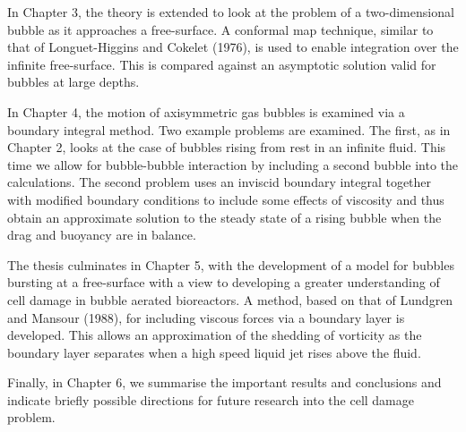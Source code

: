 In Chapter 3, the theory is extended to look at the problem of 
a two-dimensional bubble as it 
approaches a free-surface. A conformal map technique, similar to that of
Longuet-Higgins and Cokelet (1976), is used to enable integration over the
infinite free-surface. This is compared against an 
asymptotic solution valid for bubbles at large depths.

In Chapter 4, the motion of axisymmetric gas bubbles
is examined via a boundary integral method.
Two example problems are examined. The first, as in
Chapter 2, looks at the case
of bubbles rising from rest in an infinite fluid. This time we allow
for bubble-bubble interaction by including a second bubble into the
calculations.
The second problem uses an inviscid boundary integral together
with modified boundary conditions to include some effects
of viscosity and thus obtain an approximate solution to the 
steady state of a rising bubble when the drag and buoyancy
are in balance.

The thesis culminates in Chapter 5, with the development
of a model for bubbles bursting 
at a free-surface with a view to developing a greater understanding
of cell damage in bubble aerated bioreactors.
A method, based on that of Lundgren and Mansour (1988),
for including viscous forces via a boundary layer is developed.
This allows an approximation of the shedding of vorticity
as the boundary layer separates when a high speed liquid jet
rises above the fluid.

Finally, in Chapter 6, we summarise the important results and conclusions and
indicate briefly possible directions for
future research into the cell damage problem.

